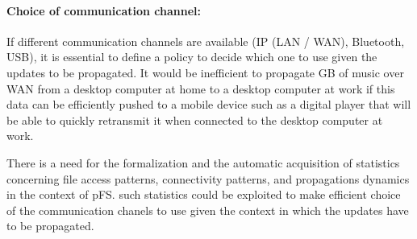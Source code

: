 %

\paragraph {Choice of communication channel:}
If different communication channels are available (IP (LAN / WAN),
Bluetooth, USB), it is essential to define a policy to decide which
one to use given the updates to be propagated. It would be inefficient
to propagate GB of music over WAN from a desktop computer at home to a
desktop computer at work if this data can be efficiently pushed to a
mobile device such as a digital player that will be able to quickly
retransmit it when connected to the desktop computer at work. 

There is a need for the formalization and the automatic acquisition of
statistics concerning file access patterns, connectivity patterns, and
propagations dynamics in the context of pFS. such statistics could be
exploited to make efficient choice of the communication chanels to
use given the context in which the updates have to be propagated.


